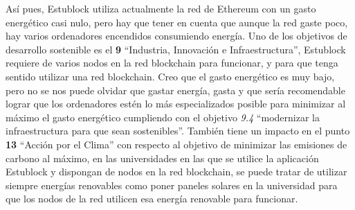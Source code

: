 Así pues, Estublock utiliza actualmente la red de Ethereum con un gasto energético casi nulo, pero hay que tener en cuenta que aunque la red gaste poco, hay varios ordenadores encendidos consumiendo energía. Uno de los objetivos de desarrollo sostenible es el \textbf{9} ``Industria, Innovación e Infraestructura'', Estublock requiere de varios nodos en la red blockchain para funcionar, y para que tenga sentido utilizar una red blockchain. Creo que el gasto energético es muy bajo, pero no se nos puede olvidar que gastar energía, gasta y que sería recomendable lograr que los ordenadores estén lo más especializados posible para minimizar al máximo el gasto energético cumpliendo con el objetivo \textit{9.4} ``modernizar la infraestructura para que sean sostenibles''. También tiene un impacto en el punto \textbf{13} ``Acción por el Clima'' con respecto al objetivo de minimizar las emisiones de carbono al máximo, en las universidades en las que se utilice la aplicación Estublock y dispongan de nodos en la red blockchain, se puede tratar de utilizar siempre energías renovables como poner paneles solares en la universidad para que los nodos de la red utilicen esa energía renovable para funcionar.

